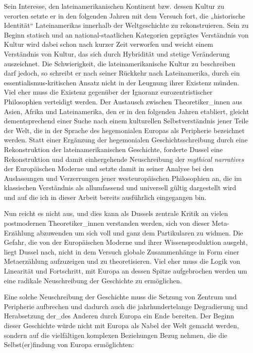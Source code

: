 Sein Interesse, den lateinamerikanischen Kontinent bzw. dessen Kultur zu
verorten setzte er in den folgenden Jahren mit dem Versuch fort, die
„historische Identität“\footnotemark {} Lateinamerikas innerhalb der Weltgeschichte zu
rekonstruieren. Sein zu Beginn statisch und an national-staatlichen Kategorien
geprägtes Verständnis von Kultur wird dabei schon nach kurzer Zeit verworfen und
weicht einem Verständnis von Kultur, das sich durch Hybridität und stetige
Veränderung auszeichnet. Die Schwierigkeit, die lateinamerikanische Kultur zu
beschreiben darf jedoch, so schreibt er nach seiner Rückkehr nach Lateinamerika,
durch ein essentialismus-kritischen Ansatz nicht in der Leugnung ihrer Existenz
münden. Viel eher muss die Existenz gegenüber der Ignoranz eurozentristischer
Philosophien verteidigt werden. Der Austausch zwischen Theoretiker\_innen aus
Asien, Afrika und Lateinamerika, den er in den folgenden Jahren etabliert,
gleicht dementsprechend einer Suche nach einem kulturellen Selbstverständnis
jener Teile der Welt, die in der Sprache des hegemonialen Europas als Peripherie
bezeichnet werden. Statt einer Ergänzung der hegemonialen Geschichtsschreibung
durch eine Rekonstruktion der lateinamerikanischen Geschichte, forderte Dussel
eine Rekonstruktion und damit einhergehende Neuschreibung der \textit{mythical
narratives} der Europäischen Moderne und setzte damit in seiner Analyse bei den
Auslassungen und Verzerrungen jener westeuropäischen Philosophien an, die im
klassischen Verständnis als allumfassend und universell gültig dargestellt wird
und auf die ich in dieser Arbeit bereits ausführlich eingegangen
bin.\footnotemark {}

Nun reicht es nicht aus, und dies kann als Dussels zentrale Kritik an vielen
postmodernen Theoretiker\_innen verstanden werden, sich von dieser Meta-Erzählung
abzuwenden um sich voll und ganz dem Partikularen zu widmen. Die Gefahr, die von
der Europäischen Moderne und ihrer Wissensproduktion ausgeht, liegt Dussel nach,
nicht in dem Versuch globale Zusammenhänge in Form einer Metaerzählung
aufzuzeigen und zu theoretisieren. Viel eher muss die Logik von Linearität und
Fortschritt, mit Europa an dessen Spitze aufgebrochen werden um eine radikale
Neuschreibung der Geschichte zu ermöglichen.

Eine solche Neuschreibung der Geschichte muss die Setzung von Zentrum und
Peripherie aufbrechen und dadurch auch die jahrhundertelange Degradierung und
Herabsetzung der\_des Anderen durch Europa ein Ende bereiten. Der Beginn dieser
Geschichte würde nicht mit Europa als Nabel der Welt gemacht werden, sondern auf
die vielfältigen komplexen Beziehungen Bezug nehmen, die die Selbst(er)findung
von Europa ermöglichten:

